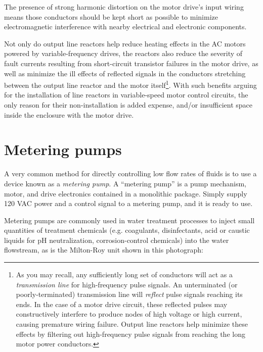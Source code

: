 The presence of strong harmonic distortion on the motor drive's input wiring means those conductors should be kept short as possible to minimize electromagnetic interference with nearby electrical and electronic components.

\vskip 10pt

Not only do output line reactors help reduce heating effects in the AC motors powered by variable-frequency drives, the reactors also reduce the severity of fault currents resulting from short-circuit transistor failures in the motor drive, as well as minimize the ill effects of reflected signals in the conductors stretching between the output line reactor and the motor itself\footnote{As you may recall, any sufficiently long set of conductors will act as a \textit{transmission line} for high-frequency pulse signals.  An unterminated (or poorly-terminated) transmission line will \textit{reflect} pulse signals reaching its ends.  In the case of a motor drive circuit, these reflected pulses may constructively interfere to produce nodes of high voltage or high current, causing premature wiring failure.  Output line reactors help minimize these effects by filtering out high-frequency pulse signals from reaching the long motor power conductors.}.  With such benefits arguing for the installation of line reactors in variable-speed motor control circuits, the only reason for their non-installation is added expense, and/or insufficient space inside the enclosure with the motor drive.









\filbreak
\section{Metering pumps}

A very common method for directly controlling low flow rates of fluids is to use a device known as a \textit{metering pump}.  A ``metering pump'' is a pump mechanism, motor, and drive electronics contained in a monolithic package.  Simply supply 120 VAC power and a control signal to a metering pump, and it is ready to use.  

Metering pumps are commonly used in water treatment processes to inject small quantities of treatment chemicals (e.g. coagulants, disinfectants, acid or caustic liquids for pH neutralization, corrosion-control chemicals) into the water flowstream, as is the Milton-Roy unit shown in this photograph:  

